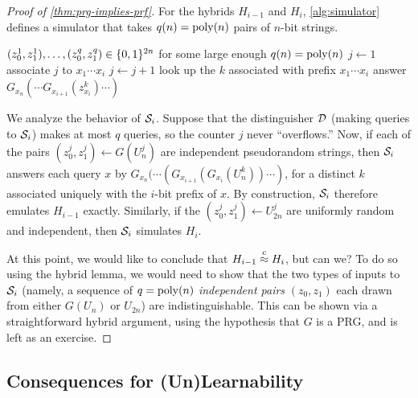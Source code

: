 \documentclass[11pt]{article}
\begin{document}
\begin{proof}[Proof of \cref{thm:prg-implies-prf}]
  For the hybrids $H_{i-1}$ and $H_{i}$, \cref{alg:simulator}
  defines a simulator that takes $q(n) = \operatorname{poly}(n)$ pairs of $n$-bit
  strings.
  
  \renewcommand{\algorithmicrequire}{\textbf{Input:}}

  \begin{algorithm}
    \caption{Simulator $\Sim_{i}$ for emulating either $H_{i-1}$ or $H_{i}$.}
    \label{alg:simulator}
    \begin{algorithmic}[1]
      \REQUIRE $(z^1_0, z^1_1), \ldots , (z^q_0, z^q_1) \in \{0,1\}^{2n}$
      for some large enough $q(n) = \operatorname{poly}(n)$
      \STATE $j \gets 1$
      \STATE associate $j$ to $x_{1} \cdots x_{i}$
      \STATE $j \gets j+1$
      \ENDIF
      \STATE look up the $k$ associated with prefix $x_{1} \cdots
      x_{i}$
      \STATE answer $G_{x_{n}}(\cdots G_{x_{i+1}}(z^{k}_{x_{i}})
      \cdots)$
      \ENDWHILE
    \end{algorithmic}
  \end{algorithm}

  We analyze the behavior of $\Sim_{i}$.  Suppose that the
  distinguisher $\mathcal{D}$ (making queries to $\Sim_{i}$) makes at most
  $q$ queries, so the counter $j$ never ``overflows.''  Now, if each
  of the pairs $(z^{j}_{0}, z^{j}_{1}) \gets G(U^{j}_{n})$ are
  independent pseudorandom strings, then $\Sim_{i}$ answers each query
  $x$ by $G_{x_{n}}(\cdots (G_{x_{i+1}}(G_{x_{i}}(U^{k}_{n}))\cdots)$,
  for a distinct $k$ associated uniquely with the $i$-bit prefix of
  $x$.  By construction, $\Sim_{i}$ therefore emulates $H_{i-1}$
  exactly.  Similarly, if the $(z^{j}_{0}, z^{j}_{1}) \gets U^j_{2n}$
  are uniformly random and independent, then $\Sim_{i}$ simulates
  $H_{i}$.

  At this point, we would like to conclude that $H_{i-1} \stackrel{c}{\approx}
  H_{i}$, but can we?  To do so using the hybrid lemma, we would need
  to show that the two types of inputs to $\Sim_{i}$ (namely, a
  sequence of $q = \operatorname{poly}(n)$ \emph{independent pairs} $(z_{0}, z_{1})$
  each drawn from either $G(U_{n})$ or $U_{2n}$) are
  indistinguishable.  This can be shown via a straightforward hybrid
  argument, using the hypothesis that $G$ is a PRG, and is left as an
  exercise.
\end{proof}

\subsection{Consequences for (Un)Learnability}
\label{sec:cons-learning}
\end{document}
